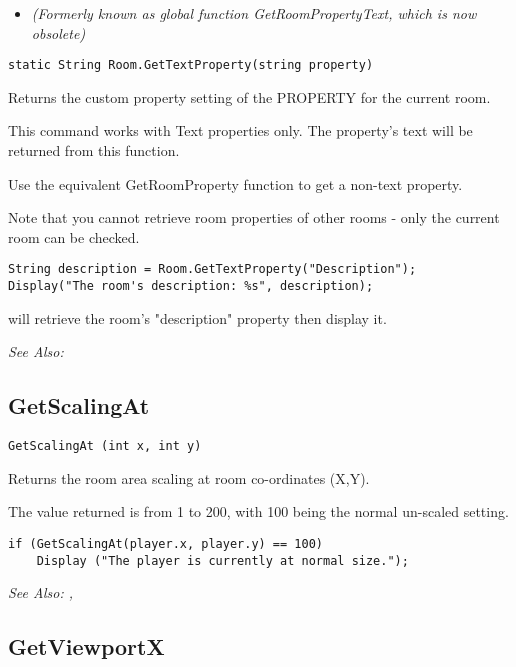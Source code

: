 \begin{itemize}
\item \it{(Formerly known as global function GetRoomPropertyText, which is now obsolete)}
\end{itemize}

\begin{verbatim}
static String Room.GetTextProperty(string property)
\end{verbatim}
Returns the custom property setting of the PROPERTY for the current room.

This command works with Text properties only. The property's text will be
returned from this function.

Use the equivalent GetRoomProperty function to get a non-text property.

Note that you cannot retrieve room properties of other rooms - only the current room
can be checked.

\begin{verbatim}
String description = Room.GetTextProperty("Description");
Display("The room's description: %s", description);
\end{verbatim}
will retrieve the room's "description" property then display it.

\it{See Also:} 


\subsection{GetScalingAt}\label{GetScalingAt}%

\begin{verbatim}
GetScalingAt (int x, int y)
\end{verbatim}
Returns the room area scaling at room co-ordinates (X,Y).

The value returned is from 1 to 200, with 100 being the normal un-scaled setting.

\begin{verbatim}
if (GetScalingAt(player.x, player.y) == 100)
    Display ("The player is currently at normal size.");
\end{verbatim}

\it{See Also:} , 



\subsection{GetViewportX}\label{GetViewportX}%

